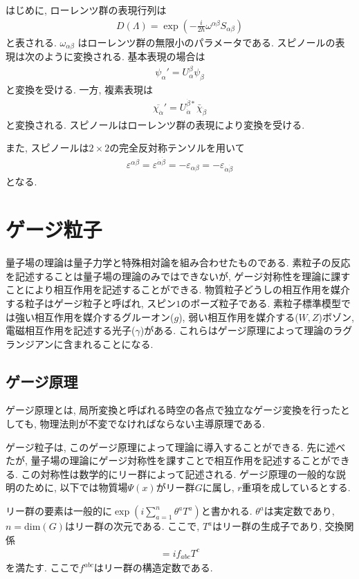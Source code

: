はじめに, ローレンツ群の表現行列は
\begin{eqnarray}
  D(\Lambda) = \exp\left(-\frac{i}{2\hbar}\omega^{\alpha\beta}S_{\alpha\beta}\right)
\end{eqnarray}
と表される.
$\omega_{\alpha\beta}$
はローレンツ群の無限小のパラメータである.
スピノールの表現は次のように変換される.
基本表現の場合は
\begin{eqnarray}
  \psi_\alpha' = U_\alpha^\beta \psi_\beta\label{spi_1}
\end{eqnarray}
と変換を受ける.
一方, 複素表現は
\begin{eqnarray}
  \overline{\chi_{\dot{\alpha}}}' = U_{\dot{\alpha}}^{\dot{\beta}*} \bar{\chi}_{\dot{\beta}}\label{spi_2}
\end{eqnarray}
と変換される.
スピノールはローレンツ群の表現により変換を受ける.

また, スピノールは$2\times2$の完全反対称テンソルを用いて
\begin{align}
  \varepsilon^{\alpha\beta} = \varepsilon^{\dot{\alpha}\dot{\beta}} = -\varepsilon_{\alpha\beta} = -\varepsilon_{\dot{\alpha}\dot{\beta}} 
\end{align}
となる.
\section{ゲージ粒子}
量子場の理論は量子力学と特殊相対論を組み合わせたものである.
素粒子の反応を記述することは量子場の理論のみではできないが, ゲージ対称性を理論に課すことにより相互作用を記述することができる.
物質粒子どうしの相互作用を媒介する粒子はゲージ粒子と呼ばれ, スピン$1$のボーズ粒子である.
素粒子標準模型では強い相互作用を媒介するグルーオン($g$), 弱い相互作用を媒介する($W, Z$)ボゾン, 電磁相互作用を記述する光子($\gamma$)がある.
これらはゲージ原理によって理論のラグランジアンに含まれることになる.
\subsection{ゲージ原理}
ゲージ原理とは, 局所変換と呼ばれる時空の各点で独立なゲージ変換を行ったとしても, 物理法則が不変でなければならない主導原理である.

ゲージ粒子は, このゲージ原理によって理論に導入することができる.
先に述べたが, 量子場の理論にゲージ対称性を課すことで相互作用を記述することができる.
この対称性は数学的にリー群によって記述される.
ゲージ原理の一般的な説明のために, 以下では物質場$\Psi(x)$がリー群$G$に属し, $r$重項を成しているとする.

リー群の要素は一般的に$\exp\left(i\sum_{a=1}^n \theta^a T^a\right)$と書かれる.
$\theta^a$は実定数であり, $n=\mathrm{dim}(G)$はリー群の次元である.
ここで, $T^a$はリー群の生成子であり, 交換関係
\begin{align}
  [T^a, T^b] = if_{abc}T^c \label{gauge-1}
\end{align}
を満たす.
ここで$f^{abc}$はリー群の構造定数である.

